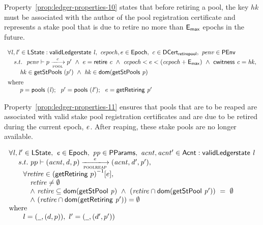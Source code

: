 \noindent
Property~\ref{prop:ledger-properties-10} states that before retiring a pool, the key $hk$ must be
associated with the author of the pool registration certificate and represents a stake pool
that is due to retire no more than $\mathsf{E_{max}}$ epochs in the future.

\begin{property}
  $$
  \begin{array}{l}
    \forall \var{l}, \var{l'} \in \ledgerState: \applyFun{validLedgerstate}{l},~\var{cepoch}, e \in \Epoch, ~
    \var{c} \in \DCertRetirePool,~
    \var{penv} \in\PEnv \\[0.5ex]
    \quad s.t. ~~ \var{penv} \vdash p \trans{pool}{c} p' ~\wedge~
    e = \applyFun{retire}{c} ~\wedge~
    \var{cepoch} < e < (\var{cepoch} + \emax)
    ~\wedge~  \applyFun{cwitness}{c} = \var{hk}, \\[1ex]
    \quad\quad\var{hk}\in \applyFun{getStPools}(p')  ~\wedge~    \var{hk} \in  \fun{dom}(\applyFun{getStPools}{p})
    \\[1ex]
    \mathrm{where}~~\\
    \quad\quad p = \applyFun{pools}(\var{l}); ~~p' = \applyFun{pools}(\var{l'}); ~~e = \applyFun{getRetiring}{p'}
  \end{array}
  $$
  \label{prop:ledger-properties-10}
\end{property}

\noindent
Property~\ref{prop:ledger-properties-11} ensures that pools that are to be reaped
are associated with valid stake pool registration certificates and are due
to be retired during the current epoch, $\mathit{e}$. After reaping, these stake
pools are no longer available.

\begin{property}
  $$
  \begin{array}{l}
    \forall \var{l}, \var{l'} \in \ledgerState, ~\var{e} \in \Epoch, ~\var{pp}\in\PParams, ~\var{acnt}, \var{acnt'}\in\Acnt :  \applyFun{validLedgerstate}{l}\\
    \quad ~s.t.~ pp\vdash\var{(acnt, d, p)} \trans{poolreap}{e} \var{(acnt, d', p')}, \\
    \quad \quad \forall \var{retire}\in{(\fun{getRetiring}~p)}^{-1}[e], \\
    \quad\quad\quad \var{retire} \neq
    \emptyset \\ \quad \quad \quad \wedge~ \var{retire} \subseteq
    \fun{dom}(\applyFun{getStPool}{p}) ~\wedge~
    (\var{retire} \cap\fun{dom}(\applyFun{getStPool}{p'}))~=~\emptyset \\
    \quad\quad\quad \wedge~ (\var{retire} \cap \fun{dom}(\applyFun{getRetiring}{p'})) = \emptyset\\
    \mathrm{where}~~\\
    \quad\quad  l = (\wcard, (d, p)), ~l' = (\wcard, (d', p'))
  \end{array}
  $$
  \label{prop:ledger-properties-11}
\end{property}

